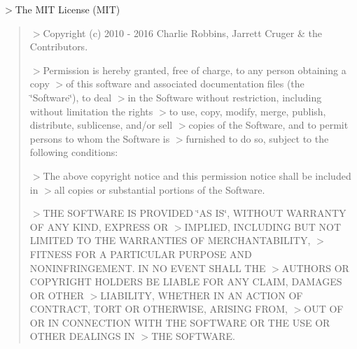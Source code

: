 $>$The M\+IT License (M\+IT) \begin{quote}


$>$Copyright (c) 2010 -\/ 2016 Charlie Robbins, Jarrett Cruger \& the Contributors.

$>$Permission is hereby granted, free of charge, to any person obtaining a copy $>$of this software and associated documentation files (the \char`\"{}\+Software\char`\"{}), to deal $>$in the Software without restriction, including without limitation the rights $>$to use, copy, modify, merge, publish, distribute, sublicense, and/or sell $>$copies of the Software, and to permit persons to whom the Software is $>$furnished to do so, subject to the following conditions\+:

$>$The above copyright notice and this permission notice shall be included in $>$all copies or substantial portions of the Software.

$>$T\+HE S\+O\+F\+T\+W\+A\+RE IS P\+R\+O\+V\+I\+D\+ED \char`\"{}\+A\+S I\+S\char`\"{}, W\+I\+T\+H\+O\+UT W\+A\+R\+R\+A\+N\+TY OF A\+NY K\+I\+ND, E\+X\+P\+R\+E\+SS OR $>$I\+M\+P\+L\+I\+ED, I\+N\+C\+L\+U\+D\+I\+NG B\+UT N\+OT L\+I\+M\+I\+T\+ED TO T\+HE W\+A\+R\+R\+A\+N\+T\+I\+ES OF M\+E\+R\+C\+H\+A\+N\+T\+A\+B\+I\+L\+I\+TY, $>$F\+I\+T\+N\+E\+SS F\+OR A P\+A\+R\+T\+I\+C\+U\+L\+AR P\+U\+R\+P\+O\+SE A\+ND N\+O\+N\+I\+N\+F\+R\+I\+N\+G\+E\+M\+E\+NT. IN NO E\+V\+E\+NT S\+H\+A\+LL T\+HE $>$A\+U\+T\+H\+O\+RS OR C\+O\+P\+Y\+R\+I\+G\+HT H\+O\+L\+D\+E\+RS BE L\+I\+A\+B\+LE F\+OR A\+NY C\+L\+A\+IM, D\+A\+M\+A\+G\+ES OR O\+T\+H\+ER $>$L\+I\+A\+B\+I\+L\+I\+TY, W\+H\+E\+T\+H\+ER IN AN A\+C\+T\+I\+ON OF C\+O\+N\+T\+R\+A\+CT, T\+O\+RT OR O\+T\+H\+E\+R\+W\+I\+SE, A\+R\+I\+S\+I\+NG F\+R\+OM, $>$O\+UT OF OR IN C\+O\+N\+N\+E\+C\+T\+I\+ON W\+I\+TH T\+HE S\+O\+F\+T\+W\+A\+RE OR T\+HE U\+SE OR O\+T\+H\+ER D\+E\+A\+L\+I\+N\+GS IN $>$T\+HE S\+O\+F\+T\+W\+A\+RE.\end{quote}
